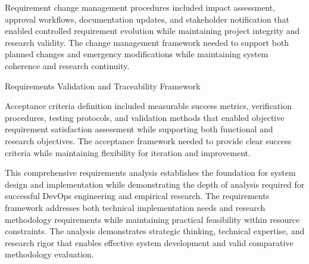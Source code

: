 Requirement change management procedures included impact assessment, approval workflows, documentation updates, and stakeholder notification that enabled controlled requirement evolution while maintaining project integrity and research validity. The change management framework needed to support both planned changes and emergency modifications while maintaining system coherence and research continuity.

\begin{table}[H]
\centering
\caption{Requirements Validation and Traceability Framework}
\label{tab:requirements-validation-traceability}
\end{table}

Acceptance criteria definition included measurable success metrics, verification procedures, testing protocols, and validation methods that enabled objective requirement satisfaction assessment while supporting both functional and research objectives. The acceptance framework needed to provide clear success criteria while maintaining flexibility for iteration and improvement.

This comprehensive requirements analysis establishes the foundation for system design and implementation while demonstrating the depth of analysis required for successful DevOps engineering and empirical research. The requirements framework addresses both technical implementation needs and research methodology requirements while maintaining practical feasibility within resource constraints. The analysis demonstrates strategic thinking, technical expertise, and research rigor that enables effective system development and valid comparative methodology evaluation.